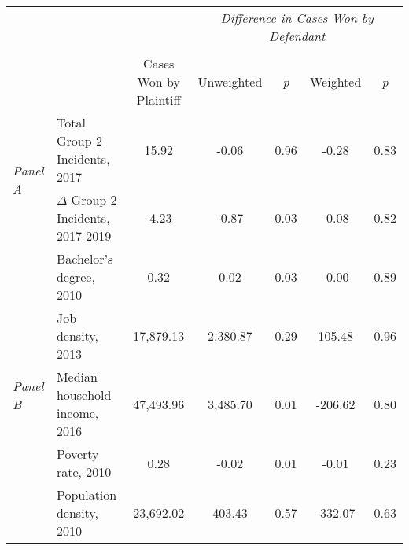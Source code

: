 \begin{tabular}{llccccc}
\toprule
 &  & \textit{} & \multicolumn{4}{c}{\textit{Difference in Cases Won by Defendant}} \\
\cline{4-7}
\\
 &  & Cases Won by Plaintiff & Unweighted & \emph{p} & Weighted & \emph{p} \\
\midrule
\multirow[c]{2}{.75cm}{\textit{Panel A}} & Total Group 2 Incidents, 2017 & 15.92 & -0.06 & 0.96 & -0.28 & 0.83 \\
 & $\Delta$ Group 2 Incidents, 2017-2019 & -4.23 & -0.87 & 0.03 & -0.08 & 0.82 \\
\cline{1-7}
\multirow[c]{5}{.75cm}{\textit{Panel B}} & Bachelor's degree, 2010 & 0.32 & 0.02 & 0.03 & -0.00 & 0.89 \\
 & Job density, 2013 & 17,879.13 & 2,380.87 & 0.29 & 105.48 & 0.96 \\
 & Median household income, 2016 & 47,493.96 & 3,485.70 & 0.01 & -206.62 & 0.80 \\
 & Poverty rate, 2010 & 0.28 & -0.02 & 0.01 & -0.01 & 0.23 \\
 & Population density, 2010 & 23,692.02 & 403.43 & 0.57 & -332.07 & 0.63 \\
\cline{1-7}
\bottomrule
\end{tabular}
